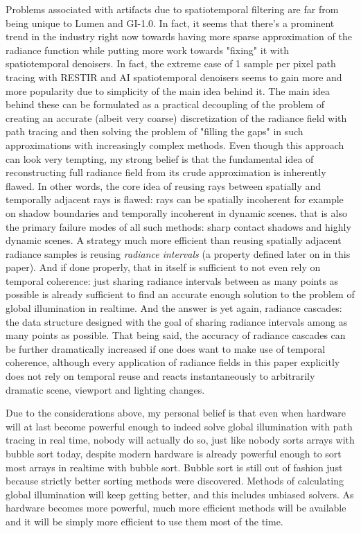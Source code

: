 \documentclass{jcgt}
\begin{document}
Problems associated with artifacts due to spatiotemporal filtering are far from being unique to Lumen and GI-1.0. In fact, it seems that there's a prominent trend in the industry right now towards having more sparse approximation of the radiance function while putting more work towards "fixing" it with spatiotemporal denoisers. In fact,
the extreme case of 1 sample per pixel path tracing with RESTIR and AI spatiotemporal denoisers seems to gain more and more popularity due to simplicity of the main idea behind it. The main idea behind these can be formulated as a practical decoupling of the problem of creating an accurate (albeit very coarse) discretization of the radiance field with path tracing and then
solving the problem of "filling the gaps" in such approximations with increasingly complex methods. Even though this approach can look very tempting, my strong belief is that the fundamental idea of reconstructing full radiance field from its crude approximation is inherently flawed. In other words, the core idea of reusing rays between spatially and temporally
adjacent rays is flawed: rays can be spatially incoherent for example on shadow boundaries and temporally incoherent in dynamic scenes. that is also the primary failure modes of all such methods: sharp contact shadows and highly dynamic scenes. A strategy much more efficient than reusing spatially adjacent radiance samples is reusing \emph{radiance intervals} (a property defined later on in this paper). And if done properly, that in itself is sufficient to not even rely on temporal coherence: just sharing radiance intervals between as many points as possible
is already sufficient to find an accurate enough solution to the problem of global illumination in realtime. And the answer is yet again, radiance cascades: the data structure designed with the goal of
sharing radiance intervals among as many points as possible. That being said, the accuracy of radiance cascades can be further dramatically increased if one does want to make use of temporal coherence,
although every application of radiance fields in this paper explicitly does not rely on temporal reuse and reacts instantaneously to arbitrarily dramatic scene, viewport and lighting changes.

Due to the considerations above, my personal belief is that even when hardware will at last become powerful enough to indeed solve global illumination with path tracing in real time, nobody will actually do so, just like nobody sorts arrays with bubble sort today, despite modern hardware is already powerful enough to sort most arrays in realtime with bubble sort. Bubble sort is still out of fashion just because strictly better sorting methods were discovered. 
Methods of calculating global illumination will keep getting better, and this includes unbiased solvers. As hardware becomes more powerful, much more efficient methods will be available and it will be simply more efficient to use them most of the time.
\end{document}
